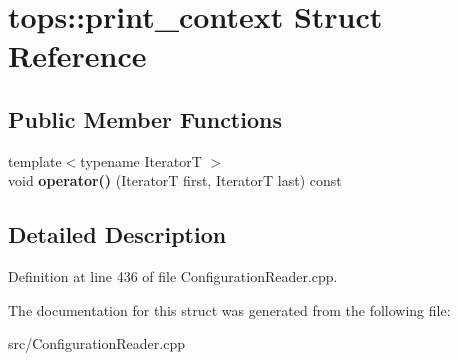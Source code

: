 \hypertarget{structtops_1_1print__context}{}\section{tops\+:\+:print\+\_\+context Struct Reference}
\label{structtops_1_1print__context}
\subsection*{Public Member Functions}
\begin{DoxyCompactItemize}
\item 
\mbox{\label{structtops_1_1print__context_ab5c9ab153ecf7aca58594f5eb4e8a1c7}} 
{\footnotesize template$<$typename IteratorT $>$ }\\void {\bfseries operator()} (IteratorT first, IteratorT last) const
\end{DoxyCompactItemize}


\subsection{Detailed Description}


Definition at line 436 of file Configuration\+Reader.\+cpp.



The documentation for this struct was generated from the following file\+:\begin{DoxyCompactItemize}
\item 
src/Configuration\+Reader.\+cpp\end{DoxyCompactItemize}
